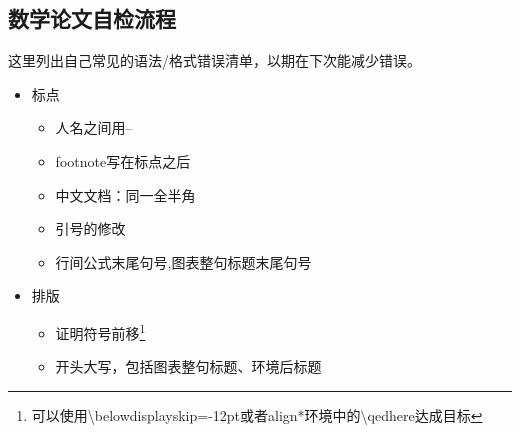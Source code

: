 \documentclass[11pt]{amsart}
\begin{document}
\subsection{数学论文自检流程}
这里列出自己常见的语法/格式错误清单，以期在下次能减少错误。
\begin{itemize}
\item 标点
\begin{itemize}
\item 人名之间用--
\item footnote写在标点之后
\item 中文文档：同一全半角
\item 引号的修改
\item 行间公式末尾句号,图表整句标题末尾句号
\end{itemize}
\item 排版
\begin{itemize}
\item 证明符号前移\footnote{可以使用\textbackslash belowdisplayskip=-12pt或者align*环境中的\textbackslash qedhere达成目标}
\item 开头大写，包括图表整句标题、环境后标题
\end{itemize}
\end{itemize}
\end{document}
